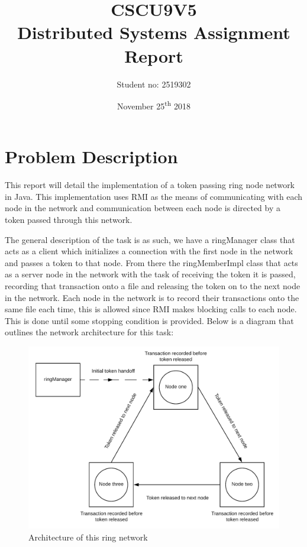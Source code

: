 \documentclass[11pt, a4paper]{article}
\title{\vspace*{\fill}CSCU9V5 \\ Distributed Systems Assignment Report}
\author{Student no: 2519302}
\date{November 25\textsuperscript{th} 2018\vspace*{\fill}}
\begin{document}
\clearpage\maketitle
\thispagestyle{empty}
\newpage
\doublespacing
{}
\tableofcontents
\thispagestyle{empty}
\newpage
\singlespacing

\section{Problem Description}

This report will detail the implementation of a token passing ring node network in Java. This implementation uses RMI as the means of communicating with each node in the network and communication between each node is directed by a token passed through this network. 

The general description of the task is as such, we have a ringManager class that acts as a client which initializes a connection with the first node in the network and passes a token to that node. From there the ringMemberImpl class that acts as a server node in the network with the task of receiving the token it is passed, recording that transaction onto a file and releasing the token on to the next node in the network. Each node in the network is to record their transactions onto the same file each time, this is allowed since RMI makes blocking calls to each node.  This is done until some stopping condition is provided. Below is a diagram that outlines the network architecture for this task:

\begin{figure}[!h]
\centering
\includegraphics[scale=0.2]{ring_net}
\caption{Architecture of this ring network}
\end{figure} 
\end{document}
